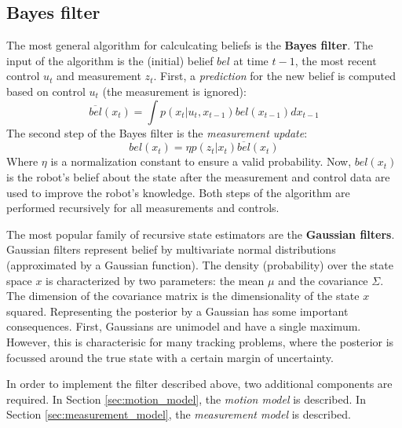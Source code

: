 \subsection{Bayes filter}
\label{sec:prob-rob-bayes}
The most general algorithm for calculcating beliefs is the \textbf{Bayes filter}.
The input of the algorithm is the (initial) belief $bel$ at time $t-1$, the most recent control $u_t$ and measurement $z_t$.
First, a \textit{prediction} for the new belief is computed based on control $u_t$ (the measurement is ignored):
\begin{equation}
\label{eq:background-theory-bayes-predict}
\overline{bel}(x_t) = \int p(x_t | u_t, x_{t-1}) bel(x_{t-1}) dx_{t-1}
\end{equation}
The second step of the Bayes filter is the \textit{measurement update}:
\begin{equation}
\label{eq:background-theory-bayes-measurement}
bel(x_t) = \eta p(z_t | x_t) \overline{bel}(x_t)
\end{equation}
Where $\eta$ is a normalization constant to ensure a valid probability.
Now, $bel(x_t)$ is the robot's belief about the state after the measurement and control data are used to improve the robot's knowledge.
Both steps of the algorithm are performed recursively for all measurements and controls.

The most popular family of recursive state estimators are the \textbf{Gaussian filters}.
Gaussian filters represent belief by multivariate normal distributions (approximated by a Gaussian function).
The density (probability) over the state space $x$ is characterized by two parameters: the mean $\mu$ and the covariance $\Sigma$.
The dimension of the covariance matrix is the dimensionality of the state $x$ squared.
Representing the posterior by a Gaussian has some important consequences.
First, Gaussians are unimodel and have a single maximum.
However, this is characterisic for many tracking problems, where the posterior is focussed around the true state with a certain margin of uncertainty.

In order to implement the filter described above, two additional components are required.
In Section \ref{sec:motion_model}, the \textit{motion model} is described.
In Section \ref{sec:measurement_model}, the \textit{measurement model} is described.

